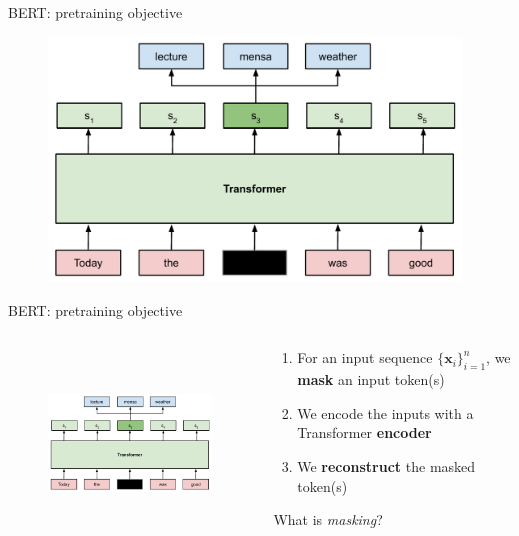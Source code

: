 \documentclass[12pt,aspectratio=169,handout]{beamer}
\begin{document}
\begin{frame}{BERT: pretraining objective}

	\begin{figure}[h]
		\includegraphics[height=6.5cm]{bert_modeling.pdf}
	\end{figure}

\end{frame}

\begin{frame}{BERT: pretraining objective}
\begin{columns}[T] %
	\begin{column}{.58\textwidth}
	\begin{figure}[h]
		\includegraphics[height=5cm]{bert_modeling.pdf}
	\end{figure}
	\end{column}

	\begin{column}{.38\textwidth}
		\begin{enumerate}
		\item For an input sequence $\{\bm{x}_i\}_{i=1}^n$, we \textbf{mask} an input token(s)
		\pause
		\item We encode the inputs with a Transformer \textbf{encoder}
		\pause
		\item We \textbf{reconstruct} the masked token(s)
		\end{enumerate}
		\pause 
		What is \textit{masking}?
	\end{column}
\end{columns}

\end{frame}
\end{document}
